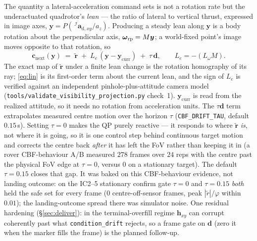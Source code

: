 \documentclass[11pt]{article}
\newcommand{\Iframe}{\mathcal{I}}
\begin{document}
The quantity a lateral-acceleration command sets is not a rotation rate but the underactuated
quadrotor's \emph{lean} --- the ratio of lateral to vertical thrust, expressed in image axes,
$\boldsymbol{y}=P(\,^\Iframe\boldsymbol{a}_{\text{d},xy}/a_z)$. Producing a steady lean along $\boldsymbol{y}$
is a body rotation about the perpendicular axis, $\boldsymbol\omega_{\rm rp}=M\boldsymbol{y}$; a
world-fixed point's image moves opposite to that rotation, so
\begin{equation}\label{eq:lin}
\boldsymbol{c}_\text{next}(\boldsymbol{y})\;=\;
\tilde{\boldsymbol{r}}\;+\;L_e\,(\boldsymbol{y}-\boldsymbol{y}_\text{curr})\;+\;\tau\,\boldsymbol{d},
\qquad L_e=-(L_\omega M).
\end{equation}
The exact map of $\tilde{\boldsymbol{r}}$ under a finite lean change is the rotation homography of its
ray; \eqref{eq:lin} is its first-order term about the current lean, and the sign of $L_e$ is verified
against an independent pinhole-plus-attitude camera model (\texttt{tools/validate\_visibility\_projection.py}
check~1). $\boldsymbol{y}_\text{curr}$ is read from the realized attitude, so it needs no rotation from
acceleration units. The $\tau\boldsymbol{d}$ term extrapolates measured centre motion over the
horizon $\tau$ (\texttt{CBF\_DRIFT\_TAU}, default $0.15$\,s). Setting $\tau=0$ makes the QP purely
reactive --- it responds to where $\tilde{\boldsymbol r}$ \emph{is}, not where it is going, so it is
one control step behind continuous target motion and corrects the centre back \emph{after} it has left
the FoV rather than keeping it in (a rover CBF-behaviour A/B measured $278$ frames over $24$ reps with
the centre past the physical FoV edge at $\tau=0$, versus $0$ on a stationary target). The default
$\tau=0.15$ closes that gap. It was baked on this CBF-behaviour evidence, not landing outcome: on the
IC2--5 stationary confirm gate $\tau=0$ and $\tau=0.15$ \emph{both} held the safe set for every frame
($0$ centre-off-sensor frames, peak $|\tilde r|/\varphi$ within $0.01$); the landing-outcome spread
there was simulator noise. One residual hardening (\S\ref{sec:deliver}): in the terminal-overfill
regime $\boldsymbol{h}_{xy}$ can corrupt coherently past what \texttt{condition\_drift} rejects, so a
frame gate on $\boldsymbol{d}$ (zero it when the marker fills the frame) is the planned follow-up.
\end{document}
